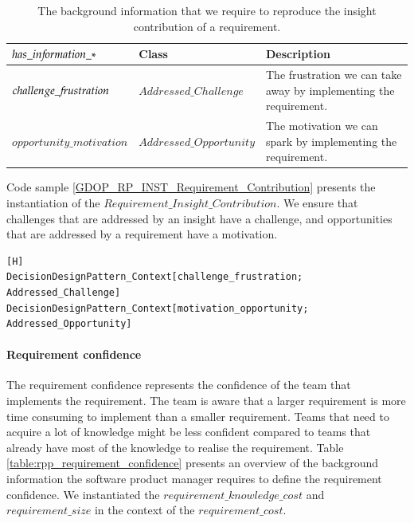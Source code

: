 \begin{table}[H]
\centering
\caption{The background information that we require to reproduce the insight contribution of a requirement.}
\begin{tabular}{| p{4cm} | p{4cm} | p{7cm} | }
\hline
\rowcolor{document}
\color{documentText}$has\_in{\mkern-2mu f\mkern-3mu}ormation\_*$ & \color{documentText}Class & \color{documentText}Description  \\
\hline
$challenge\_{\mkern-2mu f\mkern-3mu}rustration$ & $Addressed\_Challenge$ & The frustration we can take away by implementing the requirement. \\ 
\hdashline
$opportunity\_motivation$ & $Addressed\_Opportunity$ & The motivation we can spark by implementing the requirement. \\ 
\hline
\end{tabular}
\label{table:rpp_insight_contribution}
\end{table}

Code sample \ref{GDOP_RP_INST_Requirement_Contribution} presents the instantiation of the $Requirement\_Insight\_Contribution$. We ensure that challenges that are addressed by an insight have a challenge, and opportunities that are addressed by a requirement have a motivation.

\begin{lstlisting}[float,language=GDOL,caption={The GDOL instantiation code of the information reproducing the $Requirement\_Insight\_Contribution$},label={GDOP_RP_INST_Requirement_Contribution}][H]
DecisionDesignPattern_Context[challenge_frustration; Addressed_Challenge]
DecisionDesignPattern_Context[motivation_opportunity; Addressed_Opportunity]
\end{lstlisting}

\paragraph{Requirement confidence}
The requirement confidence represents the confidence of the team that implements the requirement. The team is aware that a larger requirement is more time consuming to implement than a smaller requirement. Teams that need to acquire a lot of knowledge might be less confident compared to teams that already have most of the knowledge to realise the requirement. Table \ref{table:rpp_requirement_confidence} presents an overview of the background information the software product manager requires to define the requirement confidence. We instantiated the $requirement\_knowledge\_cost$ and $requirement\_size$ in the context of the $requirement\_cost$.

